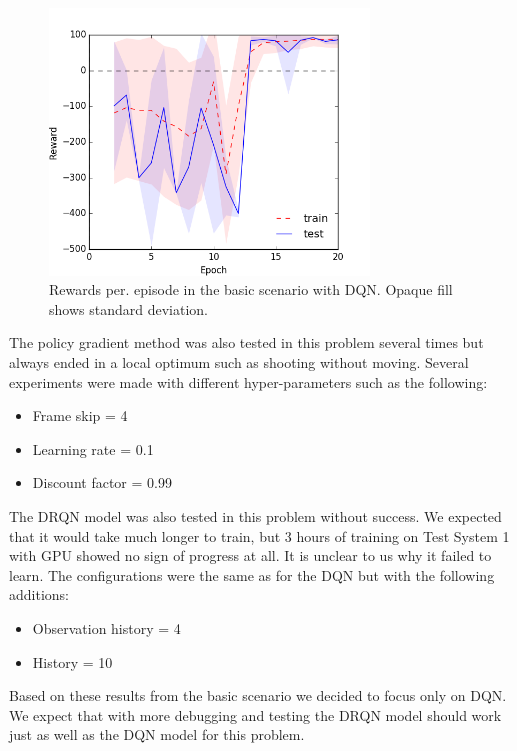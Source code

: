 \documentclass{article}
\begin{document}
\begin{figure}[htb]

\begin{minipage}[b]{1.0\linewidth}
  \centering
  \centerline{\includegraphics[width=8.5cm]{basic_adv}}
\end{minipage}
\caption{Rewards per. episode in the basic scenario with DQN. Opaque fill shows standard deviation. }
\label{fig:basic-dqn}
%
\end{figure}

The policy gradient method was also tested in this problem several times but always ended in a local optimum such as shooting without moving. Several experiments were made with different hyper-parameters such as the following:

\begin{itemize}[noitemsep]
\item Frame skip = 4
\item Learning rate = 0.1
\item Discount factor = 0.99
\end{itemize}

The DRQN model was also tested in this problem without success. We expected that it would take much longer to train, but 3 hours of training on Test System 1 with GPU showed no sign of progress at all. It is unclear to us why it failed to learn. The configurations were the same as for the DQN but with the following additions:

\begin{itemize}[noitemsep]
\item Observation history = 4
\item History = 10
\end{itemize}

Based on these results from the basic scenario we decided to focus only on DQN. We expect that with more debugging and testing the DRQN model should work just as well as the DQN model for this problem. 
\end{document}
